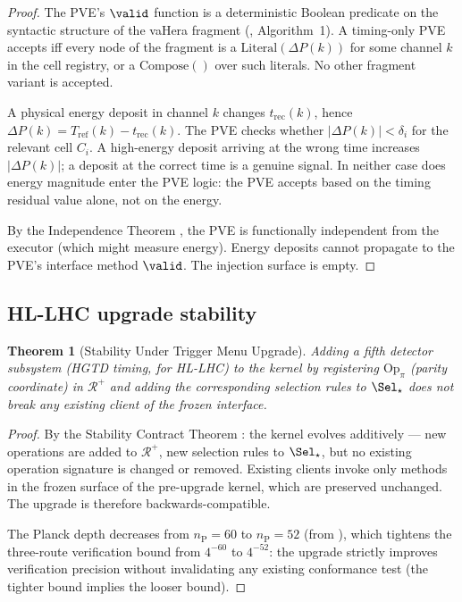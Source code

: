 \documentclass[twocolumn,10pt,a4paper]{article}
\theoremstyle{thmstyle}
\newtheorem{theorem}{Theorem}[section]
\theoremstyle{definition}
\theoremstyle{remark}
\newcommand{\nP}{n_{\mathrm{P}}}
\newcommand{\DeltaP}{\Delta P}
\newcommand{\vLit}[1]{\mathrm{Literal}(#1)}
\newcommand{\vComp}[1]{\mathrm{Compose}(#1)}
\newcommand{\Reg}{\mathcal{R}}
\begin{document}
\begin{proof}
The PVE's $\valid$ function is a deterministic Boolean predicate on the
syntactic structure of the vaHera fragment (\citealt{companion:types},
Algorithm~1). A timing-only PVE accepts iff every node of the fragment
is a $\vLit{\DeltaP(k)}$ for some channel $k$ in the cell registry,
or a $\vComp{}$ over such literals. No other fragment variant is accepted.

A physical energy deposit in channel $k$ changes $t_{\mathrm{rec}}(k)$,
hence $\DeltaP(k) = T_{\mathrm{ref}}(k) - t_{\mathrm{rec}}(k)$. The
PVE checks whether $|\DeltaP(k)| < \delta_i$ for the relevant cell $C_i$.
A high-energy deposit arriving at the wrong time increases $|\DeltaP(k)|$;
a deposit at the correct time is a genuine signal. In neither case does
energy magnitude enter the PVE logic: the PVE accepts based on the timing
residual value alone, not on the energy.

By the Independence Theorem \citep{companion:kernel}, the PVE is
functionally independent from the executor (which might measure energy).
Energy deposits cannot propagate to the PVE's interface method $\valid$.
The injection surface is empty.
\end{proof}

\subsection{HL-LHC upgrade stability}

\begin{theorem}[Stability Under Trigger Menu Upgrade]
\label{thm:stability_upgrade}
Adding a fifth detector subsystem (HGTD timing, for HL-LHC) to the kernel
by registering $\mathrm{Op}_\pi$ (parity coordinate) in $\Reg^+$ and adding
the corresponding selection rules to $\Sel_\star$ does not break any existing
client of the frozen interface.
\end{theorem}

\begin{proof}
By the Stability Contract Theorem \citep{companion:kernel}: the kernel
evolves additively — new operations are added to $\Reg^+$, new selection
rules to $\Sel_\star$, but no existing operation signature is changed or
removed. Existing clients invoke only methods in the frozen surface of
the pre-upgrade kernel, which are preserved unchanged. The upgrade is
therefore backwards-compatible.

The Planck depth decreases from $\nP = 60$ to $\nP = 52$ (from
\citealt{companion:planck}), which tightens the three-route verification
bound from $4^{-60}$ to $4^{-52}$: the upgrade strictly improves
verification precision without invalidating any existing conformance test
(the tighter bound implies the looser bound).
\end{proof}
\end{document}
